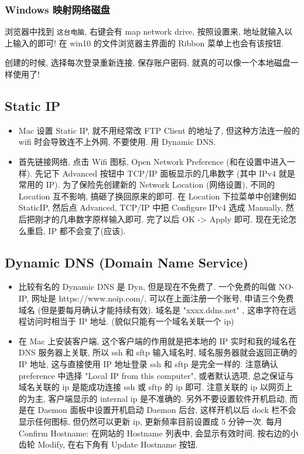 \subsubsection{Windows 映射网络磁盘}
浏览器中找到 \verb|这台电脑|, 右键会有 map network drive, 按照设置来, 地址就输入以上输入的即可! 在 win10 的文件浏览器主界面的 Ribbon 菜单上也会有该按钮.

创建的时候, 选择每次登录重新连接, 保存账户密码, 就真的可以像一个本地磁盘一样使用了!

\subsection{Static IP}
\begin{itemize}
\item Mac 设置 Static IP, 就不用经常改 FTP Client 的地址了, 但这种方法连一般的 wifi 时会导致连不上外网, 不要使用. 用 Dynamic DNS.
\item 首先链接网络, 点击 Wifi 图标, Open Network Preference (和在设置中进入一样). 先记下 Advanced 按钮中 TCP/IP 面板显示的几串数字 (其中 IPv4 就是常用的 IP). 为了保险先创建新的 Network Location (网络设置), 不同的 Location 互不影响, 搞砸了换回原来的即可. 在 Location 下拉菜单中创建例如 StaticIP, 然后点 Advanced, TCP/IP 中把 Configure IPv4 选成 Manually, 然后把刚才的几串数字原样输入即可. 完了以后 OK -> Apply 即可. 现在无论怎么重启, IP 都不会变了(应该).
\end{itemize}

\subsection{Dynamic DNS (Domain Name Service)}
\begin{itemize}
\item 比较有名的 Dynamic DNS 是 Dyn, 但是现在不免费了. 一个免费的叫做 NO-IP, 网址是 https://www.noip.com/, 可以在上面注册一个账号, 申请三个免费域名 (但是要每月确认才能持续有效).  域名是 "xxxx.ddns.net"  , 这串字符在远程访问时相当于 IP 地址. (貌似只能有一个域名关联一个 ip)

\item 在 Mac 上安装客户端, 这个客户端的作用就是把本地的 IP 实时和我的域名在 DNS 服务器上关联, 所以 ssh 和 sftp 输入域名时, 域名服务器就会返回正确的 IP 地址, 这与直接使用 IP 地址登录 ssh 和 sftp 是完全一样的.
注意确认 preference 中选择 "Local IP from this computer", 或者默认选项, 总之保证与域名关联的 ip 是能成功连接 ssh 或 sftp 的 ip 即可. 注意关联的 ip 以网页上的为主, 客户端显示的 internal ip 是不准确的.
另外不要设置软件开机启动, 而是在 Daemon 面板中设置开机启动 Daemon 后台, 这样开机以后 dock 栏不会显示任何图标, 但仍然可以更新 ip, 更新频率目前设置成 5 分钟一次.
每月 Confirm Hostname: 在网站的 Hostname 列表中, 会显示有效时间, 按右边的小齿轮 Modify, 在右下角有 Update Hostname 按钮.
\end{itemize}
